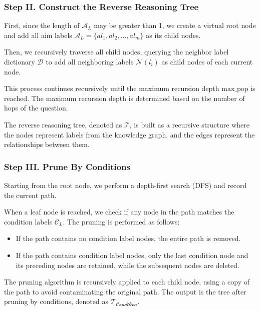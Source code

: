 \subsubsection{Step II. Construct the Reverse Reasoning Tree}

First, since the length of \( \mathcal{A}_L \) may be greater than 1, we create a virtual root node and add all aim labels \( \mathcal{A}_L = \{ al_1, al_2, \dots, al_m \} \) as its child nodes.

Then, we recursively traverse all child nodes, querying the neighbor label dictionary \( \mathcal{D} \) to add all neighboring labels \( \mathcal{N}(l_i) \) as child nodes of each current node. 

This process continues recursively until the maximum recursion depth \( \text{max\_pop} \) is reached. The maximum recursion depth is determined based on the number of hops of the question. 

The reverse reasoning tree, denoted as \( \mathcal{T} \), is built as a recursive structure where the nodes represent labels from the knowledge graph, and the edges represent the relationships between them.

\subsubsection{Step III. Prune By Conditions}

Starting from the root node, we perform a depth-first search (DFS) and record the current path.

When a leaf node is reached, we check if any node in the path matches the condition labels \( \mathcal{C}_L \). The pruning is performed as follows:

\begin{itemize}
    \item If the path contains no condition label nodes, the entire path is removed.
    \item If the path contains condition label nodes, only the last condition node and its preceding nodes are retained, while the subsequent nodes are deleted.
\end{itemize}

The pruning algorithm is recursively applied to each child node, using a copy of the path to avoid contaminating the original path. The output is the tree after pruning by conditions, denoted as \( \mathcal{T}_{\mathcal{\text{Condition}}} \).

